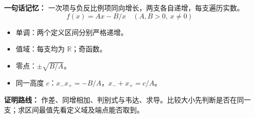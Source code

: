 \begin{summarybox}
\textbf{一句话记忆：} 一次项与负反比例项同向增长，两支各自递增，每支遍历实数。
\[
\boxed{f(x)=Ax-B/x\quad(A,B>0,\ x\ne0)}
\]
\begin{itemize}
\item 单调：两个定义区间分别严格递增。
\item 值域：每支均为 $\mathbb R$；奇函数。
\item 零点：$\pm\sqrt{B/A}$。
\item 同一高度 $c$：$x_-x_+=-B/A$，$x_-+x_+=c/A$。
\end{itemize}
\textbf{证明路线：} 作差、同增相加、判别式与韦达、求导。比较大小先判断是否在同一支；求区间最值先看定义域及端点能否取到。
\end{summarybox}
